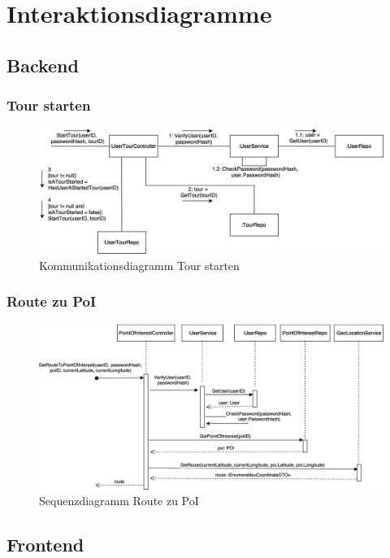 \documentclass[a4paper,10pt,xetex]{article}
\begin{document}
\clearpage
\bigskip

\section{Interaktionsdiagramme}\label{interaktionsdiagramme}
\subsection{Backend}\label{backend}

\subsubsection{Tour starten}
\begin{figure}
  \includegraphics{Kommunikationsdiagramm_StartTour}
  \caption{Kommunikationsdiagramm Tour starten}
\end{figure}

\subsubsection{Route zu PoI}
\begin{figure}
  \includegraphics{Sequenzdiagramm_GetRouteToPoi}
  \caption{Sequenzdiagramm Route zu PoI}
\end{figure}

\subsection{Frontend}\label{frontend}
\end{document}
